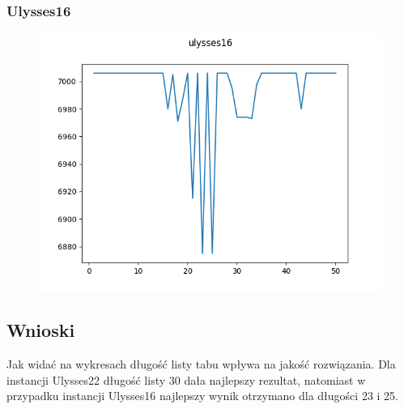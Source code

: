 \documentclass[11pt]{article}
\begin{document}
            \subsubsection{Ulysses16}
                \begin{center}
                \begin{figure}[H]

                    \includegraphics[scale=0.6]{tabuListUlysses16.png}

                \end{figure}
                \end{center}
    \subsection{Wnioski}
        Jak widać na wykresach długość listy tabu wpływa na jakość rozwiązania. Dla instancji Ulysses22
        długość listy 30 dała najlepszy rezultat, natomiast w przypadku instancji Ulysses16 najlepszy
        wynik otrzymano dla długości 23 i 25.
\end{document}
